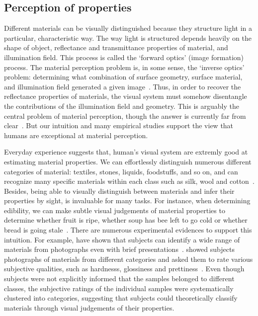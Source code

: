 \subsection{Perception of properties}
\label{sec:prop_percept}
Different materials can be visually distinguished because they structure light in a particular, characteristic way. The way light is structured depends heavily on the shape of object, reflectance and transmittance properties of material, and illumination field. This process is called the `forward optics' (image formation) process. The material perception problem is, in some sense, the `inverse optics' problem: determining what combination of surface geometry, surface material, and illumination field generated a given image~\cite{anderson2011visual}. Thus, in order to recover the reflectance properties of materials, the visual system must somehow disentangle the contributions of the illumination field and geometry. This is arguably the central problem of material perception, though the answer is currently far from clear~\cite{anderson2011visual}. But our intuition and many empirical studies support the view that humans are exceptional at material perception.

Everyday experience suggests that, human's visual system are extremly good at estimating material properties. We can effortlessly distinguish numerous different categories of material: textiles, stones, liquids, foodstuffs, and so on, and can recognize many specific materials within each class such as silk, wool and cotton~\cite{fleming2014visual}. Besides, being able to visually distinguish between materials and infer their properties by sight, is invaluable for many tasks. For instance, when determining edibility, we can make subtle visual judgements of material properties to determine whether fruit is ripe, whether soup has bee left to go cold or whether bread is going stale~\cite{fleming2014visual}. There are numerous experimental evidences to support this intuition. For example, \citeauthor{sharan2009material} have shown that subjects can identify a wide range of materials from photographs even with brief presentations~\cite{sharan2009material}. \citeauthor{fleming2013perceptual} showed subjects photographs of materials from different categories and asked them to rate various subjective qualities, such as hardnesss, glossiness and prettiness~\cite{fleming2013perceptual}. Even though subjects were not explicitly informed that the samples belonged to different classes, the subjective ratings of the individual samples were systematically clustered into categories, suggesting that subjects could theoretically classify materials through visual judgements of their properties.

